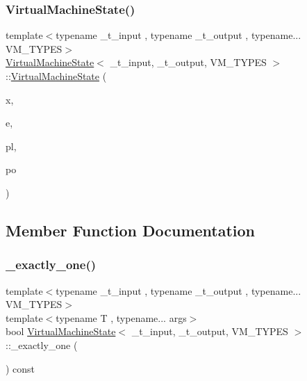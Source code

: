 \subsubsection{\texorpdfstring{Virtual\+Machine\+State()}{VirtualMachineState()}}
{\footnotesize\ttfamily template$<$typename \+\_\+t\+\_\+input , typename \+\_\+t\+\_\+output , typename... V\+M\+\_\+\+T\+Y\+P\+ES$>$ \\
\hyperlink{class_virtual_machine_state}{Virtual\+Machine\+State}$<$ \+\_\+t\+\_\+input, \+\_\+t\+\_\+output, V\+M\+\_\+\+T\+Y\+P\+ES $>$\+::\hyperlink{class_virtual_machine_state}{Virtual\+Machine\+State} (\begin{DoxyParamCaption}\item[{\hyperlink{class_virtual_machine_state_aeb5e01ec57466fd3734e0c29f2b8da0a}{input\+\_\+t}}]{x,  }\item[{\hyperlink{class_virtual_machine_state_a1015cee5061f82f82ef6a953b51f9bd5}{output\+\_\+t}}]{e,  }\item[{\hyperlink{class_program_loader}{Program\+Loader} $\ast$}]{pl,  }\item[{\hyperlink{class_virtual_machine_pool}{Virtual\+Machine\+Pool}$<$ \hyperlink{class_virtual_machine_state_ada0e1bebef2d73581c6adcd55f8be521}{this\+\_\+t} $>$ $\ast$}]{po }\end{DoxyParamCaption})\hspace{0.3cm}{\ttfamily [inline]}}



\subsection{Member Function Documentation}
\mbox{\label{class_virtual_machine_state_a301aafa7a503b733f221d7850d1a8886}} 
\subsubsection{\texorpdfstring{\+\_\+exactly\+\_\+one()}{\_exactly\_one()}}
{\footnotesize\ttfamily template$<$typename \+\_\+t\+\_\+input , typename \+\_\+t\+\_\+output , typename... V\+M\+\_\+\+T\+Y\+P\+ES$>$ \\
template$<$typename T , typename... args$>$ \\
bool \hyperlink{class_virtual_machine_state}{Virtual\+Machine\+State}$<$ \+\_\+t\+\_\+input, \+\_\+t\+\_\+output, V\+M\+\_\+\+T\+Y\+P\+ES $>$\+::\+\_\+exactly\+\_\+one (\begin{DoxyParamCaption}{ }\end{DoxyParamCaption}) const\hspace{0.3cm}{\ttfamily [inline]}}



